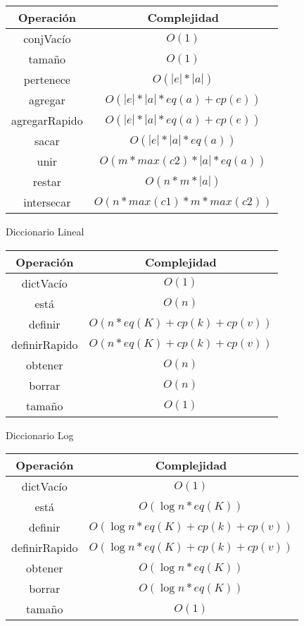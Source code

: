 \documentclass{article}
\begin{document}
\begin{multicols}{2}
\begin{center}
	\begin{tabular}{|c|c|}
		\hline
		\textbf{Operación} & \textbf{Complejidad} \\
		\hline
		conjVacío & $O(1)$ \\
		tamaño & $O(1)$ \\
		pertenece & $O(|e| * |a|)$ \\
		agregar & $O(|e| * |a| * eq(a) + cp(e))$ \\
		agregarRapido & $O(|e| * |a| * eq(a) + cp(e))$ \\
		sacar & $O(|e| * |a| * eq(a))$ \\
		unir & $O(m * max(c2) * |a| * eq(a))$ \\
		restar & $O(n * m * |a|)$ \\
		intersecar & $O(n * max(c1) * m * max(c2))$ \\
		\hline
	\end{tabular}
\end{center}


\begin{center}
	\begin{large}Diccionario Lineal\end{large}
	\vspace*{2mm}
	
	\begin{tabular}{|c|c|}
		\hline
		\textbf{Operación} & \textbf{Complejidad} \\
		\hline
		dictVacío & $O(1)$ \\
		está & $O(n)$ \\
		definir & $O(n * eq(K) + cp(k) + cp(v))$ \\
		definirRapido & $O(n * eq(K) + cp(k) + cp(v))$ \\
		obtener & $O(n)$ \\
		borrar & $O(n)$ \\
		tamaño & $O(1)$ \\
		\hline
	\end{tabular}
\end{center}


\begin{center}
	\begin{large}Diccionario Log\end{large}
	\vspace*{2mm}
	
	\begin{tabular}{|c|c|}
		\hline
		\textbf{Operación} & \textbf{Complejidad} \\
		\hline
		dictVacío & $O(1)$ \\
		está & $O(\log n * eq(K))$ \\
		definir & $O(\log n * eq(K) + cp(k) + cp(v))$ \\
		definirRapido & $O(\log n * eq(K) + cp(k) + cp(v))$ \\
		obtener & $O(\log n * eq(K))$ \\
		borrar & $O(\log n * eq(K))$ \\
		tamaño & $O(1)$ \\
		\hline
	\end{tabular}
\end{center}



\end{multicols}
\end{document}
